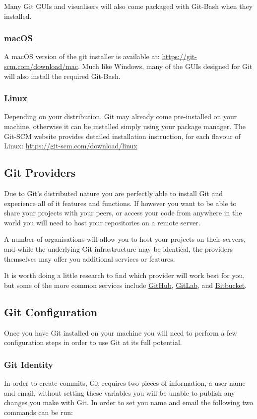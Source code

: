 \documentclass[11pt, a4paper, titlepage]{article}
\begin{document}
Many Git GUIs and visualisers will also come packaged with Git-Bash when they
installed.

\subsubsection{macOS}
A macOS version of the git installer is available at:
\url{https://git-scm.com/download/mac}.
Much like Windows, many of the GUIs designed for Git will also install the
required Git-Bash.

\subsubsection{Linux}
Depending on your distribution, Git may already come pre-installed on your
machine, otherwise it can be installed simply using your package manager.
The Git-SCM website provides detailed installation instruction, for each
flavour of Linux: \url{https://git-scm.com/download/linux}


\subsection{Git Providers}
Due to Git's distributed nature you are perfectly able to install Git and
experience all of it features and functions. 
If however you want to be able to
share your projects with your peers, or access your code from anywhere in the
world you will need to host your repositories on a remote server.

A number of organisations will allow you to host your projects on their
servers, and while the underlying Git infrastructure may be identical, the
providers themselves may offer you additional services or features.

It is worth doing a little research to find which provider will work best for
you, but some of the more common services include
\href{https://github.com}{GitHub}, \href{https://gitlab.com}{GitLab}, and
\href{https://bitbucket.org}{Bitbucket}.


\subsection{Git Configuration}
Once you have Git installed on your machine you will need to perform a few
configuration steps in order to use Git at its full potential.

\subsubsection{Git Identity}
In order to create commits, Git requires two pieces of information, a user
name and email, without setting these variables you will be unable to publish
any changes you make with Git.
In order to set you name and email the following two commands can be run:
\end{document}
